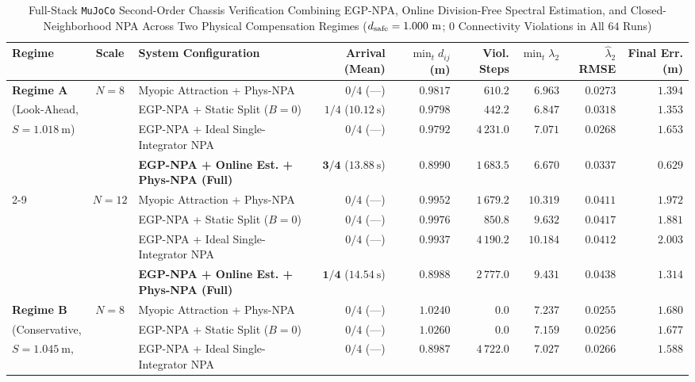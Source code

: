 \begin{table}[t]
 \centering\footnotesize
 \caption{Full-Stack \texttt{MuJoCo} Second-Order Chassis Verification Combining EGP-NPA, Online Division-Free Spectral Estimation, and Closed-Neighborhood NPA Across Two Physical Compensation Regimes ($d_{\mathrm{safe}}=1.000\ \mathrm m$; $0$ Connectivity Violations in All $64$ Runs)}\label{tab:mujoco}
 \setlength{\tabcolsep}{4.5pt}
 \begin{tabularx}{\textwidth}{@{}lcXrrrrrr@{}}
 \toprule
 Regime & Scale & System Configuration & Arrival (Mean) & $\min_t d_{ij}$ (m) & Viol. Steps & $\min_t\lambda_2$ & $\hat{\lambda}_2$ RMSE & Final Err. (m)\\
 \midrule
 \textbf{Regime A} & $N=8$ & Myopic Attraction + Phys-NPA & $0/4$ (---) & $0.9817$ & $610.2$ & $6.963$ & $0.0273$ & $1.394$\\
 (Look-Ahead, & & EGP-NPA + Static Split ($B=0$) & $1/4$ ($10.12\ \mathrm s$) & $0.9798$ & $442.2$ & $6.847$ & $0.0318$ & $1.353$\\
 $S=1.018\ \mathrm m$) & & EGP-NPA + Ideal Single-Integrator NPA & $0/4$ (---) & $0.9792$ & $4\,231.0$ & $7.071$ & $0.0268$ & $1.653$\\
 & & \textbf{EGP-NPA + Online Est. + Phys-NPA (Full)} & $\mathbf{3/4}$ ($\mathbf{13.88\ \mathrm s}$) & $0.8990$ & $1\,683.5$ & $6.670$ & $0.0337$ & $\mathbf{0.629}$\\
 \cmidrule{2-9}
 & $N=12$ & Myopic Attraction + Phys-NPA & $0/4$ (---) & $0.9952$ & $1\,679.2$ & $10.319$ & $0.0411$ & $1.972$\\
 & & EGP-NPA + Static Split ($B=0$) & $0/4$ (---) & $0.9976$ & $850.8$ & $9.632$ & $0.0417$ & $1.881$\\
 & & EGP-NPA + Ideal Single-Integrator NPA & $0/4$ (---) & $0.9937$ & $4\,190.2$ & $10.184$ & $0.0412$ & $2.003$\\
 & & \textbf{EGP-NPA + Online Est. + Phys-NPA (Full)} & $\mathbf{1/4}$ ($\mathbf{14.54\ \mathrm s}$) & $0.8988$ & $2\,777.0$ & $9.431$ & $0.0438$ & $\mathbf{1.314}$\\
 \midrule
 \textbf{Regime B} & $N=8$ & Myopic Attraction + Phys-NPA & $0/4$ (---) & $1.0240$ & $0.0$ & $7.237$ & $0.0255$ & $1.680$\\
 (Conservative, & & EGP-NPA + Static Split ($B=0$) & $0/4$ (---) & $1.0260$ & $0.0$ & $7.159$ & $0.0256$ & $1.677$\\
 $S=1.045\ \mathrm m$, & & EGP-NPA + Ideal Single-Integrator NPA & $0/4$ (---) & $0.8987$ & $4\,722.0$ & $7.027$ & $0.0266$ & $1.588$\\

\end{tabularx}
\end{table}
